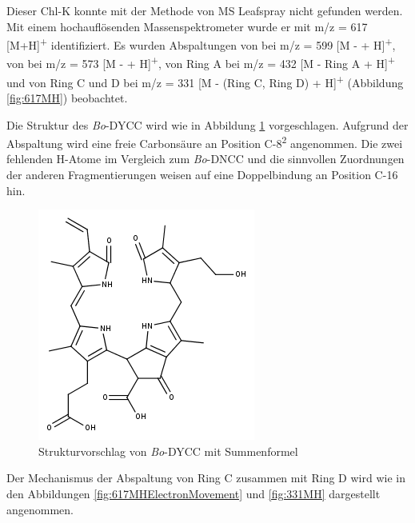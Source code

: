 Dieser \gls{Chl-K} konnte mit der Methode von MS Leafspray nicht gefunden werden. Mit einem hochauflösenden Massenspektrometer wurde er mit m/z = 617 [M+H]\textsuperscript{+} identifiziert. Es wurden Abspaltungen von  bei m/z = 599 [M -  + H]\textsuperscript{+}, von  bei m/z = 573 [M -  + H]\textsuperscript{+}, von Ring A bei m/z = 432 [M - Ring A + H]\textsuperscript{+} und von Ring C und D bei m/z = 331 [M - (Ring C, Ring D) + H]\textsuperscript{+} (Abbildung \ref{fig:617MH}) beobachtet.

Die Struktur des \textit{Bo}-DYCC  wird wie in Abbildung \ref{fig:617MHStruktur} vorgeschlagen. Aufgrund der  Abspaltung wird eine freie Carbonsäure an Position C-8\textsuperscript{2} angenommen. Die zwei fehlenden H-Atome im Vergleich zum \textit{Bo}-DNCC und die sinnvollen Zuordnungen der anderen Fragmentierungen weisen auf eine Doppelbindung an Position C-16 hin.  

\begin{figure}[!htbp]
  \centering
  \includegraphics[scale=0.6]{figures/Kapitel7/Kataboliten/fragmentation_structures/VWA_Katabolit_617.png}
  \caption[Strukturvorschlag von \textit{Bo}-DYCC, Quelle: Autor]{Strukturvorschlag von \textit{Bo}-DYCC mit Summenformel }
  \label{fig:617MHStruktur}
\end{figure}

Der Mechanismus der Abspaltung von Ring C zusammen mit Ring D wird wie in den Abbildungen \ref{fig:617MHElectronMovement} und \ref{fig:331MH} dargestellt angenommen. 

